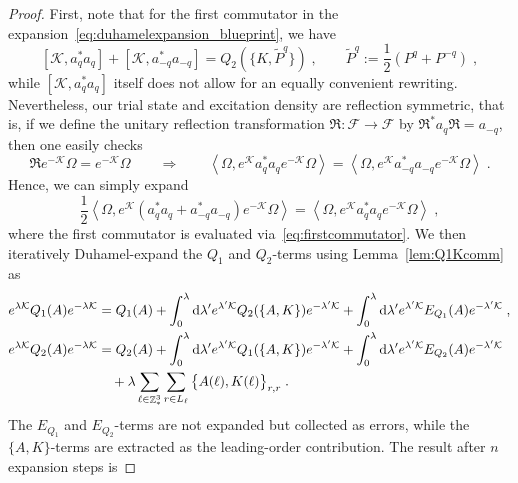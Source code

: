 \documentclass[12pt,a4paper]{article}
\numberwithin{equation}{section}
\newcommand{\cF}{\mathcal{F}}
\newcommand{\cK}{\mathcal{K}}
\newcommand{\fR}{\mathfrak{R}}
\newcommand{\1}{\mathbb{I}}
\newcommand{\di}{\textnormal{d}}
\DeclareMathOperator{\Z}{\mathbb{Z}}
\newcommand{\half}{\frac{1}{2}}
\newcommand{\eva}[1]{\left\langle #1 \right\rangle}
\theoremstyle{plain}
\theoremstyle{definition}
\theoremstyle{remark}
\theoremstyle{plain}
\theoremstyle{definition}
\theoremstyle{remark}
\begin{document}
\begin{proof}
First, note that for the first commutator in the expansion~\eqref{eq:duhamelexpansion_blueprint}, we have
\begin{equation} \label{eq:firstcommutator}
	[\cK, a_q^* a_q] + [\cK, a_{-q}^* a_{-q}]
	= Q_2(\{K,\tilde{P}^q\}) \;, \qquad
	\tilde{P}^q := \half(P^q + P^{-q}) \;,
\end{equation}
while $ [\cK, a_q^* a_q] $ itself does not allow for an equally convenient rewriting. Nevertheless, our trial state and excitation density are reflection symmetric, that is, if we define the unitary reflection transformation $ \fR: \cF \to \cF $ by $ \fR^* a_q \fR = a_{-q} $, then one easily checks
\begin{equation} \label{eq:reflectionsymmetry}
	\fR e^{-\cK} \Omega = e^{-\cK} \Omega \qquad \Rightarrow \qquad
	\eva{\Omega, e^{\cK} a^*_q a_q e^{-\cK}\Omega} = \eva{\Omega, e^{\cK} a^*_{-q} a_{-q} e^{-\cK} \Omega} \;.
\end{equation}
Hence, we can simply expand
\begin{equation}
	\half \eva{\Omega, e^{\cK} (a_q^* a_q + a_{-q}^* a_{-q}) e^{-\cK} \Omega} 
	= \eva{\Omega, e^{\cK} a_q^* a_q e^{-\cK} \Omega} \;,
\end{equation}
where the first commutator is evaluated via~\eqref{eq:firstcommutator}. We then iteratively Duhamel-expand the $ Q_1 $ and $ Q_2 $-terms using Lemma~\ref{lem:Q1Kcomm} as
\begin{equation}
\begin{aligned}
	e^{\lambda \cK} Q_1(A) e^{-\lambda \cK}
	&= Q_1(A) + \int_0^{\lambda} \di \lambda' e^{\lambda' \cK} Q_2(\{A,K\}) e^{-\lambda' \cK}
		+ \int_0^{\lambda} \di \lambda' e^{\lambda' \cK} E_{Q_1}(A) e^{-\lambda' \cK} \;, \\
	e^{\lambda \cK} Q_2(A) e^{-\lambda \cK}
	&= Q_2(A) + \int_0^{\lambda} \di \lambda' e^{\lambda' \cK} Q_1(\{A,K\}) e^{-\lambda' \cK}
		+ \int_0^{\lambda} \di \lambda' e^{\lambda' \cK} E_{Q_2}(A) e^{-\lambda' \cK} \\
	&\quad + \lambda \sum\limits_{\ell \in \Z^3_*} \sum\limits_{r \in L_{\ell}} \big\{ A(\ell), K(\ell) \big\}_{r,r} \;.
\end{aligned}
\end{equation}
The $ E_{Q_1} $ and $ E_{Q_2} $-terms are not expanded but collected as errors, while the $ \{A,K\} $-terms are extracted as the leading-order contribution. The result after $ n $ expansion steps is

\end{proof}
\end{document}
